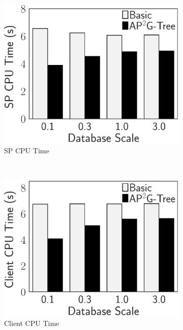 \begin{figure}[t]
    \centering
    \begin{subfigure}{.33\linewidth}
        \includegraphics[height=\ht\figbox]{exp-figs/access-control/scale_sp.eps}
        \caption{SP CPU Time}
    \end{subfigure}~%
    \begin{subfigure}{.33\linewidth}
        \includegraphics[height=\ht\figbox]{exp-figs/access-control/scale_user.eps}
        \caption{Client CPU Time}
    \end{subfigure}~%
    \begin{subfigure}{.33\linewidth}

\end{subfigure}
\end{figure}
